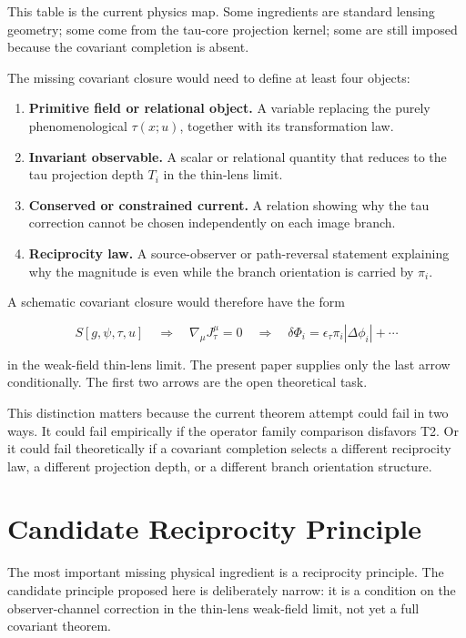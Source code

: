 \documentclass[11pt]{article}
\providecommand{\tightlist}{%
  \setlength{\itemsep}{0pt}\setlength{\parskip}{0pt}}
\begin{document}
This table is the current physics map. Some ingredients are standard
lensing geometry; some come from the tau-core projection kernel; some
are still imposed because the covariant completion is absent.

The missing covariant closure would need to define at least four
objects:

\begin{enumerate}
\def\labelenumi{\arabic{enumi}.}
\tightlist
\item
  \textbf{Primitive field or relational object.} A variable replacing
  the purely phenomenological \(\tau(x;u)\), together with its
  transformation law.
\item
  \textbf{Invariant observable.} A scalar or relational quantity that
  reduces to the tau projection depth \(T_i\) in the thin-lens limit.
\item
  \textbf{Conserved or constrained current.} A relation showing why the
  tau correction cannot be chosen independently on each image branch.
\item
  \textbf{Reciprocity law.} A source-observer or path-reversal statement
  explaining why the magnitude is even while the branch orientation is
  carried by \(\pi_i\).
\end{enumerate}

A schematic covariant closure would therefore have the form

\[
S[g,\psi,\tau,u]
\quad\Longrightarrow\quad
\nabla_\mu J^\mu_\tau = 0
\quad\Longrightarrow\quad
\delta\Phi_i
=
\epsilon_\tau\pi_i|\Delta\phi_i|
+\cdots
\]

in the weak-field thin-lens limit. The present paper supplies only the
last arrow conditionally. The first two arrows are the open theoretical
task.

This distinction matters because the current theorem attempt could fail
in two ways. It could fail empirically if the operator family comparison
disfavors T2. Or it could fail theoretically if a covariant completion
selects a different reciprocity law, a different projection depth, or a
different branch orientation structure.

\section{Candidate Reciprocity
Principle}\label{candidate-reciprocity-principle}

The most important missing physical ingredient is a reciprocity
principle. The candidate principle proposed here is deliberately narrow:
it is a condition on the observer-channel correction in the thin-lens
weak-field limit, not yet a full covariant theorem.
\end{document}
